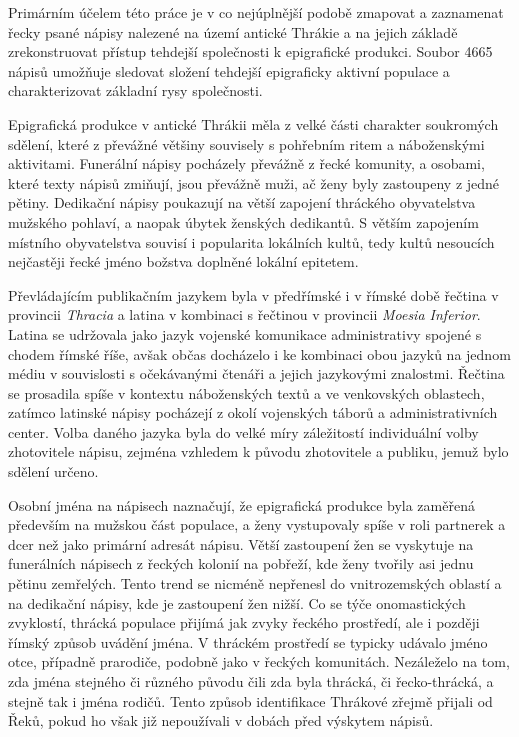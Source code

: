 Primárním účelem této práce je v co nejúplnější podobě zmapovat a zaznamenat řecky psané nápisy nalezené na území antické Thrákie a na jejich základě zrekonstruovat přístup tehdejší společnosti k epigrafické produkci. Soubor 4665 nápisů umožňuje sledovat složení tehdejší epigraficky aktivní populace a charakterizovat základní rysy společnosti.

Epigrafická produkce v antické Thrákii měla z velké části charakter soukromých sdělení, které z převážné většiny souvisely s pohřebním ritem a náboženskými aktivitami. Funerální nápisy pocházely převážně z řecké komunity, a osobami, které texty nápisů zmiňují, jsou převážně muži, ač ženy byly zastoupeny z jedné pětiny. Dedikační nápisy poukazují na větší zapojení thráckého obyvatelstva mužského pohlaví, a naopak úbytek ženských dedikantů. S větším zapojením místního obyvatelstva souvisí i popularita lokálních kultů, tedy kultů nesoucích nejčastěji řecké jméno božstva doplněné lokální epitetem.

Převládajícím publikačním jazykem byla v předřímské i v římské době řečtina v provincii {\em Thracia} a latina v kombinaci s řečtinou v provincii {\em Moesia Inferior}. Latina se udržovala jako jazyk vojenské komunikace administrativy spojené s chodem římské říše, avšak občas docházelo i ke kombinaci obou jazyků na jednom médiu v souvislosti s očekávanými čtenáři a jejich jazykovými znalostmi. Řečtina se prosadila spíše v kontextu náboženských textů a ve venkovských oblastech, zatímco latinské nápisy pocházejí z okolí vojenských táborů a administrativních center. Volba daného jazyka byla do velké míry záležitostí individuální volby zhotovitele nápisu, zejména vzhledem k původu zhotovitele a publiku, jemuž bylo sdělení určeno.

Osobní jména na nápisech naznačují, že epigrafická produkce byla zaměřená především na mužskou část populace, a ženy vystupovaly spíše v roli partnerek a dcer než jako primární adresát nápisu. Větší zastoupení žen se vyskytuje na funerálních nápisech z řeckých kolonií na pobřeží, kde ženy tvořily asi jednu pětinu zemřelých. Tento trend se nicméně nepřenesl do vnitrozemských oblastí a na dedikační nápisy, kde je zastoupení žen nižší. Co se týče onomastických zvyklostí, thrácká populace přijímá jak zvyky řeckého prostředí, ale i později římský způsob uvádění jména. V thráckém prostředí se typicky udávalo jméno otce, případně prarodiče, podobně jako v řeckých komunitách. Nezáleželo na tom, zda jména stejného či různého původu čili zda byla thrácká, či řecko-thrácká, a stejně tak i jména rodičů. Tento způsob identifikace Thrákové zřejmě přijali od Řeků, pokud ho však již nepoužívali v dobách před výskytem nápisů.

